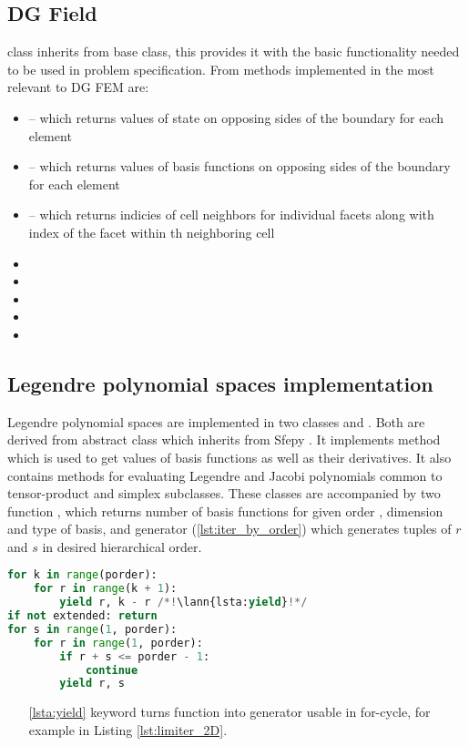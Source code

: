 \subsection{DG Field}
 class inherits from  base class, this provides it with the basic functionality needed
to be used in problem specification. From methods implemented in  the most relevant to DG FEM are:
\begin{itemize}
	\item {} -- which returns values of state on 
	opposing sides of the boundary for each element
	\item {} -- which returns values of basis functions 
	on opposing sides of the boundary for each element
	\item {} -- which returns indicies of cell neighbors 
	for individual facets along with index of the facet within th neighboring cell 
	\item {}
	\item {}
	\item {}
	\item {}
	\item {}
\end{itemize}

\subsection{Legendre polynomial spaces implementation}
Legendre polynomial spaces are implemented in two classes 
 and 
. Both are derived from abstract class 
 which inherits from Sfepy 
. It implements method  which is used to 
get values of basis functions as well as their derivatives. It also contains 
methods for evaluating Legendre and Jacobi polynomials common to tensor-product 
and simplex subclasses. These classes are accompanied by two function , which returns number of basis functions for given order , dimension and type of basis, and generator  (\ref{lst:iter_by_order}) which generates tuples of $r$ and $s$ in desired hierarchical order.
\setcounter{lstannotation}{0}
\begin{lstlisting}[language=Python, caption= Itaration over $r$ and $s$ indicies of basis functions \label{lst:iter_by_order}]
for k in range(porder):
	for r in range(k + 1):
		yield r, k - r /*!\lann{lsta:yield}!*/
if not extended: return
for s in range(1, porder):
	for r in range(1, porder):
		if r + s <= porder - 1:
			continue
		yield r, s
\end{lstlisting}
\begin{itemize}
	\item[\ref{lsta:yield}]  keyword turns function into generator usable in for-cycle, for example in Listing \ref{lst:limiter_2D}.
\end{itemize}


